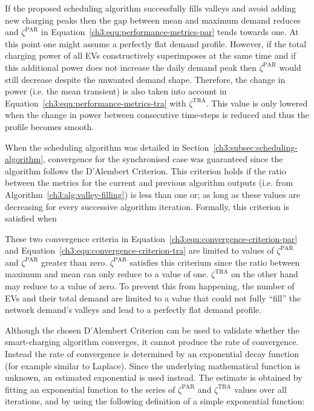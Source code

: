 If the proposed scheduling algorithm successfully fills valleys and avoid adding new charging peaks then the gap between mean and maximum demand reduces and $\zeta^\text{PAR}$ in Equation~\ref{ch3:equ:performance-metrics-par} tends towards one.
At this point one might assume a perfectly flat demand profile.
However, if the total charging power of all EVs constructively superimposes at the same time and if this additional power does not increase the daily demand peak then $\zeta^\text{PAR}$ would still decrease despite the unwanted demand shape.
Therefore, the change in power (i.e. the mean transient) is also taken into account in Equation~\ref{ch3:equ:performance-metrics-tra} with $\zeta^\text{TRA}$.
This value is only lowered when the change in power between consecutive time-steps is reduced and thus the profile becomes smooth.

When the scheduling algorithm was detailed in Section~\ref{ch3:subsec:scheduling-algorithm}, convergence for the synchronised case was guaranteed since the algorithm follows the D'Alembert Criterion.
This criterion holds if the ratio between the metrics for the current and previous algorithm outputs (i.e. from Algorithm~\ref{ch3:alg:valley-filling}) is less than one or; as long as these values are decreasing for every successive algorithm iteration.
Formally, this criterion is satisfied when



These two convergence criteria in Equation~\ref{ch3:equ:convergence-criterion-par} and Equation~\ref{ch3:equ:convergence-criterion-tra} are limited to values of $\zeta^\text{PAR}$ and $\zeta^\text{PAR}$ greater than zero.
$\zeta^\text{PAR}$ satisfies this criterium since the ratio between maximum and mean can only reduce to a value of one.
$\zeta^\text{TRA}$ on the other hand may reduce to a value of zero.
To prevent this from happening, the number of EVs and their total demand are limited to a value that could not fully ``fill'' the network demand's valleys and lead to a perfectly flat demand profile.

Although the chosen D'Alembert Criterion can be used to validate whether the smart-charging algorithm converges, it cannot produce the rate of convergence.
Instead the rate of convergence is determined by an exponential decay function (for example similar to Laplace).
Since the underlying mathematical function is unknown, an estimated exponential is used instead.
The estimate is obtained by fitting an exponential function to the series of $\zeta^\text{PAR}$ and $\zeta^\text{TRA}$ values over all iterations, and by using the following definition of a simple exponential function:

